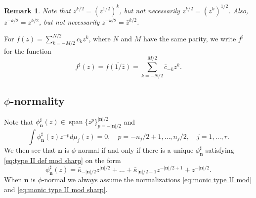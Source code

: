 \documentclass[reqno,centertags,11pt,draft]{amsart}
\newtheorem{rem}[thm]{Remark}
\newcommand{\abs}[1]{\left|#1\right|}
\begin{document}
\begin{rem}
    Note that $z^{k/2} = (z^{1/2})^k$, but not necessarily $z^{k/2} = (z^k)^{1/2}$. Also, $z^{-k/2} = \overline{z^{k/2}}$, but not necessarily $z^{-k/2} = \bar{z}^{k/2}$. 
\end{rem}

For $f(z) = \sum_{k = -M/2}^{N/2}c_kz^k$, where $N$ and $M$ have the same parity, we write $f^\sharp$ for the function 
\begin{equation}
    f^\sharp(z) = \overline{f(1/\bar{z})} = \sum_{k = -N/2}^{M/2}\bar{c}_{-k}z^k.
\end{equation}

\subsection{$\phi$-normality}
Note that $\phi_{\bm{n}}^\sharp(z) \in \operatorname{span}\{z^p\}_{p = -\abs{\bm{n}}/2}^{\abs{\bm{n}}/2}$ and
\begin{equation}\label{eq:type II def mod sharp}
    \int \phi_{\bm{n}}^{\sharp}(z)z^{-p}d\mu_j(z) = 0, \quad p = -n_j/2+1,\ldots,n_j/2, \quad j = 1,\dots,r.
\end{equation}
We then see that $\bm{n}$ is $\phi$-normal if and only if there is a unique $\phi_{\bm{n}}^{\sharp}$ satisfying \eqref{eq:type II def mod sharp} on the form
\begin{equation}\label{eq:monic type II mod sharp}
        \phi^\sharp_{\bm{n}}(z) = \bar\kappa_{-\abs{\bm{n}}/2}z^{\abs{\bm{n}}/2} + \ldots+ \bar\kappa_{\abs{\bm{n}}/2-1}z^{-\abs{\bm{n}}/2+1} + z^{-\abs{\bm{n}}/2}.
\end{equation} 
When $\bm{n}$ is $\phi$-normal we always assume the normalizations \eqref{eq:monic type II mod} and \eqref{eq:monic type II mod sharp}.
\end{document}
